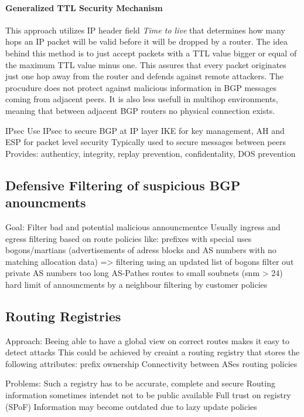 \documentclass[12pt]{IEEEtran}
\begin{document}
		\paragraph{Generalized TTL Security Mechanism}
		This approach utilizes  IP header field \emph{Time to live} that determines how many hops an IP packet will be valid before it will be dropped by a router. The idea behind this method is to just accept packets with a TTL value bigger or equal of the maximum TTL value minus one. This assures that every packet originates just one hop away from the router and defends against remote attackers. The procudure does not protect against malicious information in BGP messages coming from adjacent peers. It is also less usefull in multihop environments, meaning that between adjacent BGP routers no physical connection exists.
				
			IPsec
				Use IPsec to secure BGP at IP layer 
				IKE for key management, AH and ESP for packet level security
				Typically used to secure messages between peers
				Provides: authenticy, integrity, replay prevention, confidentality, DOS prevention
			


       \subsection{Defensive Filtering of suspicious BGP anouncments}
	Goal: Filter bad and potential malicious announcmentce 
	Usually ingress and egress filtering based on route policies like:
			prefixes with special uses
			bogons/martians (advertisements of adress blocks and AS numbers with no matching allocation data)
				=> filtering using an updated list of bogons
			filter out private AS numbers
			too long AS-Pathes
			routes to small soubnets (snm > 24) 
			hard limit of announcments by a neighbour 
			filtering by customer policies
				

       \subsection{Routing Registries}
		Approach: Beeing able to have a global view on correct routes makes it easy to detect attacks
		This could be achieved by creaint a routing registry that stores the following attributes:
			prefix ownership
			Connectivity between ASes
			routing policies
			
		Problems: 
			Such a registry has to be accurate, complete and secure
			Routing information sometimes intendet not to be public available
			Full trust on registry (SPoF)
			Information may become outdated due to lazy update policies
       		
\end{document}

